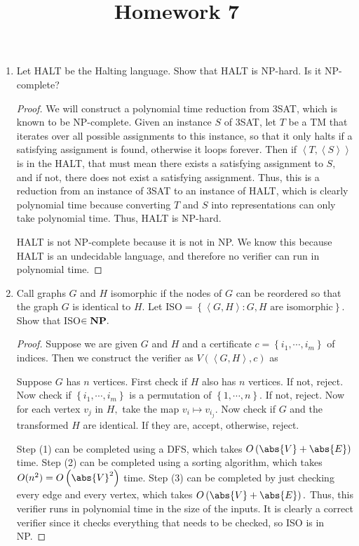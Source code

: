 \documentclass{article}
\begin{document}
\title{Homework 7}
\maketitle
\thispagestyle{fancy}

\begin{enumerate}
	\item Let HALT be the Halting language. Show that HALT is NP-hard. Is it NP-complete?
		\begin{proof}
			We will construct a polynomial time reduction from 3SAT, which is known to be NP-complete. Given an instance $S$ of 3SAT, let $T$ be a TM that iterates over all possible assignments to this instance, so that it only halts if a satisfying assignment is found, otherwise it loops forever. Then if $\left< T, \left< S\right>\right>$ is in the HALT, that must mean there exists a satisfying assignment to $S,$ and if not, there does not exist a satisfying assignment. Thus, this is a reduction from an instance of 3SAT to an instance of HALT, which is clearly polynomial time because converting $T$ and $S$ into representations can only take polynomial time. Thus, HALT is NP-hard.

			HALT is not NP-complete because it is not in NP. We know this because HALT is an undecidable language, and therefore no verifier can run in polynomial time.
		\end{proof}

		\newpage
	\item Call graphs $G$ and $H$ isomorphic if the nodes of $G$ can be reordered so that the graph $G$ is identical to $H.$ Let ISO$=\left\{ \left< G, H\right>: G, H\text{ are isomorphic} \right\}.$ Show that ISO$\in \bf{NP}.$
		\begin{proof}
			Suppose we are given $G$ and $H$ and a certificate $c=\left\{ i_1, \cdots, i_m \right\}$ of indices. Then we construct the verifier as $V( \left< G, H\right>, c)$ as
			\begin{enumerate}[(1)]
				\ii Suppose $G$ has $n$ vertices. First check if $H$ also has $n$ vertices. If not, reject.
				\ii Now check if $\left\{ i_1, \cdots, i_m \right\}$ is a permutation of $\left\{ 1, \cdots, n \right\}.$ If not, reject.
				\ii Now for each vertex $v_j$ in $H,$ take the map $v_i\mapsto v_{i_j}.$ Now check if $G$ and the transformed $H$ are identical. If they are, accept, otherwise, reject.
			\end{enumerate}

			Step (1) can be completed using a DFS, which takes $O\left(\abs{V}+\abs{E}\right)$ time. Step (2) can be completed using a sorting algorithm, which takes $O(n^2)=O\left( \abs{V}^2 \right)$ time. Step (3) can be completed by just checking every edge and every vertex, which takes $O\left( \abs{V}+\abs{E} \right).$ Thus, this verifier runs in polynomial time in the size of the inputs. It is clearly a correct verifier since it checks everything that needs to be checked, so ISO is in NP.
		\end{proof}


\end{enumerate}
\end{document}
